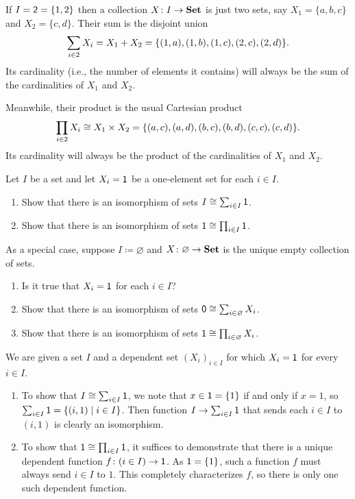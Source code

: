 \documentclass[Book-Poly]{subfiles}
\begin{document}
\begin{example}\label{ex.two_sums_and_prods}
If $I=\textsf{2}=\{1,2\}$ then a collection $X\colon I\to \textbf{Set}$ is just two sets, say $X_1=\{a,b,c\}$ and $X_2=\{c,d\}$. Their sum is the disjoint union
\[\sum_{i\in \textsf{2}}X_i=X_1+X_2=\{(1,a),(1,b),(1,c),(2,c),(2,d)\}.\]
Its cardinality (i.e., the number of elements it contains) will always be the sum of the cardinalities of $X_1$ and $X_2$.

Meanwhile, their product is the usual Cartesian product
\[\prod_{i\in \textsf{2}}X_i \cong X_1\times X_2=\{(a,c),(a,d),(b,c),(b,d),(c,c),(c,d)\}.\]
Its cardinality will always be the product of the cardinalities of $X_1$ and $X_2$.
\end{example}


\begin{exercise}\label{exc.on_sums_prods_sets}
Let $I$ be a set and let $X_i=\textsf{1}$ be a one-element set for each $i\in I$. 
\begin{enumerate}
	\item \label{exc.on_sums_prods_sets.sum} Show that there is an isomorphism of sets $I\cong\sum_{i\in I}\textsf{1}$.
	\item Show that there is an isomorphism of sets $\textsf{1}\cong\prod_{i\in I}\textsf{1}$.
\end{enumerate}
As a special case, suppose $I\coloneqq\varnothing$ and $X\colon \varnothing\to\textbf{Set}$ is the unique empty collection of sets.
\begin{enumerate}[resume]
	\item Is it true that $X_i=\textsf{1}$ for each $i\in I$?
	\item Show that there is an isomorphism of sets $\textsf{0}\cong\sum_{i\in\varnothing}X_i$.
	\item Show that there is an isomorphism of sets $\textsf{1}\cong\prod_{i\in\varnothing}X_i$.
\qedhere
\end{enumerate}

\begin{solution}
We are given a set $I$ and a dependent set $(X_i)_{i \in I}$ for which $X_i = \textsf{1}$ for every $i \in I$.
\begin{enumerate}
    \item \label{sol.on_sums_prods_sets.sum}
    To show that $I \cong \sum_{i \in I} \textsf{1}$, we note that $x \in \textsf{1} = \{1\}$ if and only if $x = 1$, so $\sum_{i \in I} \textsf{1} = \{(i, 1) \mid i \in I\}$.
    Then function $I \to \sum_{i \in I} \textsf{1}$ that sends each $i \in I$ to $(i, 1)$ is clearly an isomorphism.
    
    \item \label{sol.on_sums_prods_sets.prod}
    To show that $\textsf{1} \cong \prod_{i \in I} \textsf{1}$, it suffices to demonstrate that there is a unique dependent function $f \colon (i \in I) \to \textsf{1}$.
    As $\textsf{1} = \{1\}$, such a function $f$ must always send $i \in I$ to $1$.
    This completely characterizes $f$, so there is only one such dependent function.
    

\end{enumerate}
\end{solution}
\end{exercise}
\end{document}
